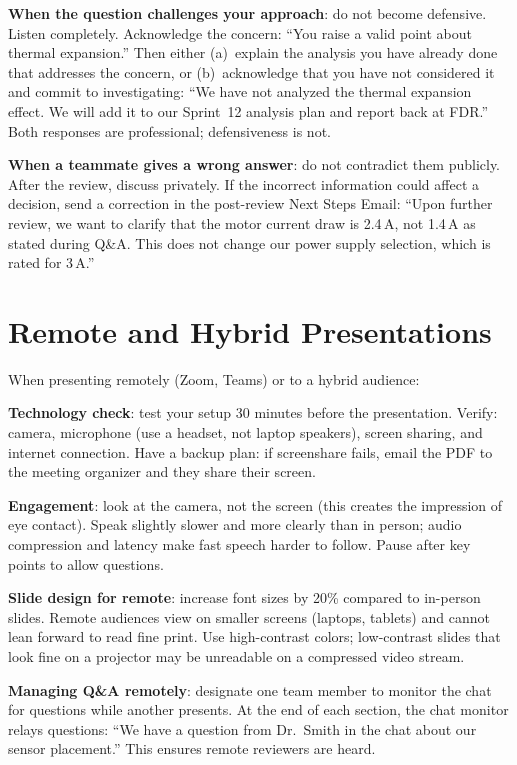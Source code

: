 \textbf{When the question challenges your approach}: do not become defensive. Listen completely. Acknowledge the concern: ``You raise a valid point about thermal expansion.'' Then either (a)~explain the analysis you have already done that addresses the concern, or (b)~acknowledge that you have not considered it and commit to investigating: ``We have not analyzed the thermal expansion effect. We will add it to our Sprint~12 analysis plan and report back at FDR.'' Both responses are professional; defensiveness is not.

\textbf{When a teammate gives a wrong answer}: do not contradict them publicly. After the review, discuss privately. If the incorrect information could affect a decision, send a correction in the post-review Next Steps Email: ``Upon further review, we want to clarify that the motor current draw is 2.4\,A, not 1.4\,A as stated during Q\&A. This does not change our power supply selection, which is rated for 3\,A.''

\section{Remote and Hybrid Presentations}
When presenting remotely (Zoom, Teams) or to a hybrid audience:

\textbf{Technology check}: test your setup 30 minutes before the presentation. Verify: camera, microphone (use a headset, not laptop speakers), screen sharing, and internet connection. Have a backup plan: if screenshare fails, email the PDF to the meeting organizer and they share their screen.

\textbf{Engagement}: look at the camera, not the screen (this creates the impression of eye contact). Speak slightly slower and more clearly than in person; audio compression and latency make fast speech harder to follow. Pause after key points to allow questions.

\textbf{Slide design for remote}: increase font sizes by 20\% compared to in-person slides. Remote audiences view on smaller screens (laptops, tablets) and cannot lean forward to read fine print. Use high-contrast colors; low-contrast slides that look fine on a projector may be unreadable on a compressed video stream.

\textbf{Managing Q\&A remotely}: designate one team member to monitor the chat for questions while another presents. At the end of each section, the chat monitor relays questions: ``We have a question from Dr.~Smith in the chat about our sensor placement.'' This ensures remote reviewers are heard.



